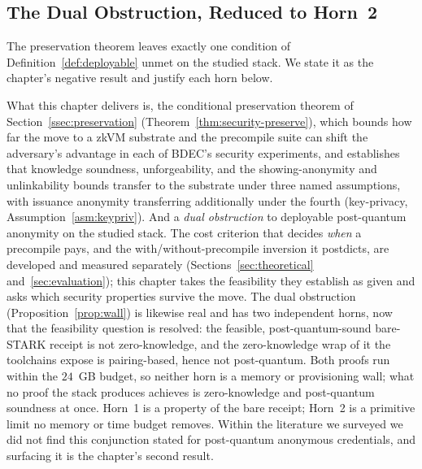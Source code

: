 \subsection{The Dual Obstruction, Reduced to Horn~2}\label{ssec:zk-gap}
The preservation theorem leaves exactly one condition of Definition~\ref{def:deployable} unmet on the studied stack. We state it as the chapter's negative result and justify each horn below.

What this chapter delivers is, the conditional preservation theorem of Section~\ref{ssec:preservation} (Theorem~\ref{thm:security-preserve}), which bounds how far the move to a zkVM substrate and the precompile suite can shift the adversary's advantage in each of BDEC's security experiments, and establishes that knowledge soundness, unforgeability, and the showing-anonymity and unlinkability bounds transfer to the substrate under three named assumptions, with issuance anonymity transferring additionally under the fourth (key-privacy, Assumption~\ref{asm:keypriv}). And a \emph{dual obstruction} to deployable post-quantum anonymity on the studied stack. The cost criterion that decides \emph{when} a precompile pays, and the with/without-precompile inversion it postdicts, are developed and measured separately (Sections~\ref{sec:theoretical} and~\ref{sec:evaluation}); this chapter takes the feasibility they establish as given and asks which security properties survive the move. The dual obstruction (Proposition~\ref{prop:wall}) is likewise real and has two independent horns, now that the feasibility question is resolved: the feasible, post-quantum-sound bare-STARK receipt is not zero-knowledge, and the zero-knowledge wrap of it the toolchains expose is pairing-based, hence not post-quantum. Both proofs run within the $24$~GB budget, so neither horn is a memory or provisioning wall; what no proof the stack produces achieves is zero-knowledge and post-quantum soundness at once. Horn~1 is a property of the bare receipt; Horn~2 is a primitive limit no memory or time budget removes. Within the literature we surveyed we did not find this conjunction stated for post-quantum anonymous credentials, and surfacing it is the chapter's second result.

